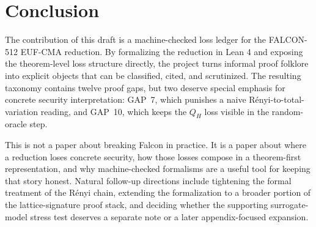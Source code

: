 \documentclass[11pt]{article}
\begin{document}
\section{Conclusion}

The contribution of this draft is a machine-checked loss ledger for the FALCON-512 EUF-CMA reduction. By formalizing the reduction in Lean 4 and exposing the theorem-level loss structure directly, the project turns informal proof folklore into explicit objects that can be classified, cited, and scrutinized. The resulting taxonomy contains twelve proof gaps, but two deserve special emphasis for concrete security interpretation: GAP~7, which punishes a naive R\'{e}nyi-to-total-variation reading, and GAP~10, which keeps the $Q_H$ loss visible in the random-oracle step.

This is not a paper about breaking Falcon in practice. It is a paper about where a reduction loses concrete security, how those losses compose in a theorem-first representation, and why machine-checked formalisms are a useful tool for keeping that story honest. Natural follow-up directions include tightening the formal treatment of the R\'{e}nyi chain, extending the formalization to a broader portion of the lattice-signature proof stack, and deciding whether the supporting surrogate-model stress test deserves a separate note or a later appendix-focused expansion.
\end{document}
